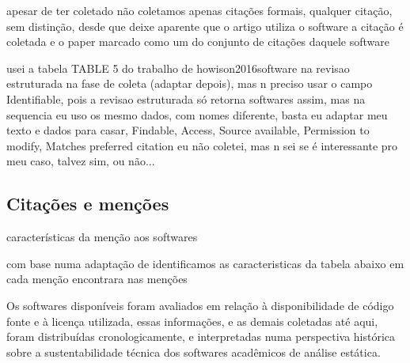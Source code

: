 apesar de ter coletado não coletamos apenas citações formais, qualquer citação,
sem distinção, desde que deixe aparente que o artigo utiliza o software a citação
é coletada e o paper marcado como um do conjunto de citações daquele software

usei a tabela TABLE 5 do trabalho de howison2016software na revisao estruturada
na fase de coleta (adaptar depois), mas n preciso usar o campo Identifiable, pois
a revisao estruturada só retorna softwares assim, mas na sequencia eu uso os
mesmo dados, com nomes diferente, basta eu adaptar meu texto e dados para casar,
Findable, Access, Source available, Permission to modify, Matches preferred citation eu
não coletei, mas n sei se é interessante pro meu caso, talvez sim, ou não...

\subsection{Citações e menções}

características da menção aos softwares

com base numa adaptação de \cite{howison2016software} identificamos as caracteristicas
da tabela abaixo em cada menção encontrara nas menções


Os softwares disponíveis foram avaliados em relação à disponibilidade de código
fonte e à licença utilizada, essas informações, e as demais coletadas até aqui,
foram distribuídas cronologicamente, e interpretadas numa perspectiva histórica
sobre a sustentabilidade técnica dos softwares acadêmicos de análise estática.

